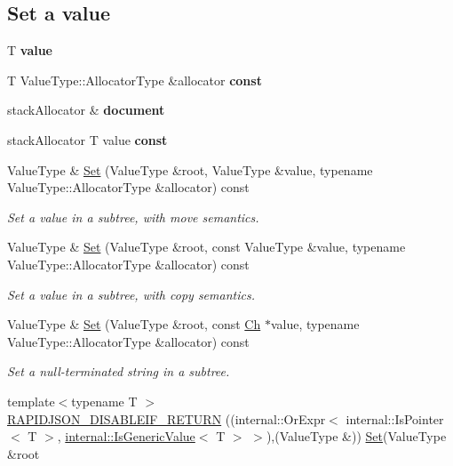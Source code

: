 \subsection*{Set a value}
\begin{DoxyCompactItemize}
\item 
\mbox{\label{a02232_a08ef35da0ea9a51d8265a360f0c34540}} 
T {\bfseries value}
\item 
T Value\+Type\+::\+Allocator\+Type \&allocator {\bfseries const}
\item 
\mbox{\label{a02232_afd073c4e3be53fd7ec08aec9f75fbaa9}} 
stack\+Allocator \& {\bfseries document}
\item 
stack\+Allocator T value {\bfseries const}
\item 
Value\+Type \& \hyperlink{a02232_a71476d125a276b62a246990da1bd3468}{Set} (Value\+Type \&root, Value\+Type \&value, typename Value\+Type\+::\+Allocator\+Type \&allocator) const
\begin{DoxyCompactList}\small\item\em Set a value in a subtree, with move semantics. \end{DoxyCompactList}\item 
\mbox{\label{a02232_a61c0e9695cb0c96d465c8e1c21bd48fa}} 
Value\+Type \& \hyperlink{a02232_a61c0e9695cb0c96d465c8e1c21bd48fa}{Set} (Value\+Type \&root, const Value\+Type \&value, typename Value\+Type\+::\+Allocator\+Type \&allocator) const
\begin{DoxyCompactList}\small\item\em Set a value in a subtree, with copy semantics. \end{DoxyCompactList}\item 
\mbox{\label{a02232_a37ea2d2b205d3642d1e615b8b866666b}} 
Value\+Type \& \hyperlink{a02232_a37ea2d2b205d3642d1e615b8b866666b}{Set} (Value\+Type \&root, const \hyperlink{a02232_ab292356c11b4015c98d21b966b11f285}{Ch} $\ast$value, typename Value\+Type\+::\+Allocator\+Type \&allocator) const
\begin{DoxyCompactList}\small\item\em Set a null-\/terminated string in a subtree. \end{DoxyCompactList}\item 
{\footnotesize template$<$typename T $>$ }\\\hyperlink{a02232_a914bbdd96e2a248e035b8ebd68526369}{R\+A\+P\+I\+D\+J\+S\+O\+N\+\_\+\+D\+I\+S\+A\+B\+L\+E\+I\+F\+\_\+\+R\+E\+T\+U\+RN} ((internal\+::\+Or\+Expr$<$ internal\+::\+Is\+Pointer$<$ T $>$, \hyperlink{a02020}{internal\+::\+Is\+Generic\+Value}$<$ T $>$ $>$),(Value\+Type \&)) \hyperlink{a02232_a71476d125a276b62a246990da1bd3468}{Set}(Value\+Type \&root

\end{DoxyCompactItemize}
